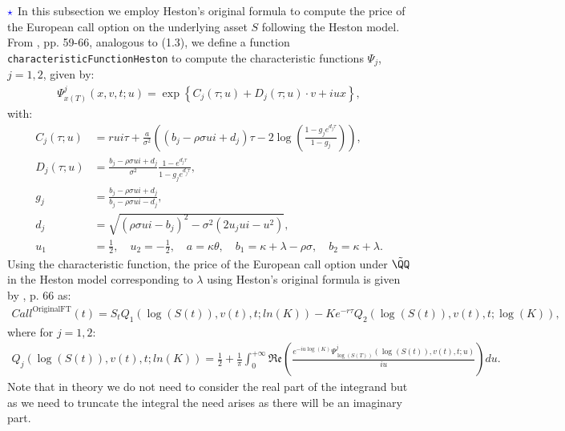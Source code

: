 \documentclass[12pt]{article}
\numberwithin{equation}{section}
\newcommand{\lc}{\left\{}
\newcommand{\rc}{\right\}}
\begin{document}
$\textcolor{blue}{\star}$ In this subsection we employ Heston's original formula
to compute the price of the European call option on the underlying asset $S$
following the Heston model. From \cite{Havrylenko2024}, pp. 59-66, analogous to
(1.3), we define a function \texttt{characteristicFunctionHeston} to compute the
characteristic functions $\Psi_j$, $j=1,2$, given by:
\begin{align*}
    \Psi_{x(T)}^j(x,v,t;u)=\exp \lc C_j (\tau; u) + D_j (\tau; u) \cdot v + i  u x \rc,
\end{align*}
with:
\begin{align*}
    C_j(\tau ; u) &= rui\tau + \frac{a}{\sigma^2}\left( (b_j - \rho\sigma ui + d_j) \tau - 2 \log \left( \frac{1 - g_j e^{d_j \tau}}{1 - g_j} \right) \right), \\
    D_j(\tau ; u) &= \frac{b_j - \rho \sigma ui + d_j}{\sigma^2} \frac{1 - e^{d_j \tau}}{1 - g_j e^{d_j \tau}}, \\
    g_j &= \frac{b_j - \rho\sigma ui + d_j}{b_j - \rho\sigma ui - d_j}, \\
    d_j &= \sqrt{(\rho\sigma ui - b_j)^2 - \sigma^2(2u_jui - u^2)},\\
    u_1 &= \frac{1}{2}, \quad u_2 = -\frac{1}{2}, \quad a = \kappa\theta, \quad b_1 = \kappa + \lambda - \rho\sigma, \quad b_2 = \kappa + \lambda.
\end{align*}
Using the characteristic function, the price of the European call option under
$\tilde{\QQ}$ in the Heston model corresponding to $\lambda$ using Heston's
original formula is given by \cite{Havrylenko2024}, p. 66 as:
\begin{align*}
    Call^{\text{OriginalFT}}(t)=S_tQ_1(\log(S(t)),v(t),t;ln(K))-Ke^{-r\tau}Q_2(\log(S(t)),v(t),t;\log(K)),
\end{align*}
where for $j=1,2$:
\begin{align*}
    Q_j(\log(S(t)),v(t),t;ln(K))=\frac{1}{2}+\frac{1}{\pi}\int_0^{+\infty} \mathfrak{Re} \left ( \frac{e^{-iu\log(K)}\Psi^j_{\log(S(T))}(\log(S(t)),v(t),t;u)}{iu}\right )du.
\end{align*}
Note that in theory we do not need to consider the real part of the integrand
but as we need to truncate the integral the need arises as there will be an
imaginary part. 
\end{document}
